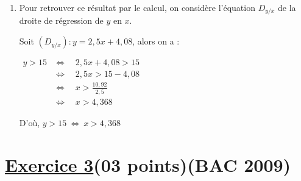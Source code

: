 \documentclass[12pt,a4paper]{article}
\begin{document}
\begin{enumerate}
\begin{enumerate}
\item Pour retrouver ce résultat par le calcul, on considère l’équation \( D_{y/x} \) de la droite de régression de \( y \) en \( x \).

Soit \( (D_{y/x}) : y = 2{,}5x + 4{,}08 \), alors on a :

\(
\begin{aligned}
y > 15 &\Leftrightarrow \quad 2{,}5x + 4{,}08 > 15 \\
       &\Leftrightarrow \quad 2{,}5x > 15 - 4{,}08 \\
       &\Leftrightarrow \quad x > \frac{10{,}92}{2{,}5} \\
       &\Leftrightarrow \quad x > 4{,}368
\end{aligned}
\)

D’où, \( y > 15 \ \Leftrightarrow \ x > 4{,}368 \)
\end{enumerate}
\end{enumerate}

\section*{\underline{Exercice 3}(03 points)(BAC 2009)}
\end{document}
